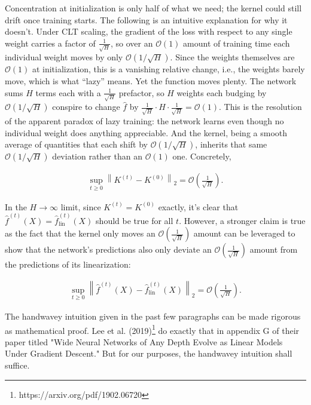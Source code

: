 Concentration at initialization is only half of what we need; the kernel could still drift once
training starts. The following is an intuitive explanation for why it doesn't. Under CLT scaling, the gradient
of the loss with respect to any single weight carries a factor of $\frac{1}{\sqrt{H}}$, so over an
$\mathcal{O}(1)$ amount of training time each individual weight moves by only
$\mathcal{O}(1/\sqrt{H})$. Since the weights themselves are $\mathcal{O}(1)$ at initialization, this
is a vanishing relative change, i.e., the weights barely move, which is what ``lazy'' means.
Yet the function moves plenty. The network sums $H$ terms each with a $\frac{1}{\sqrt H}$ prefactor,
so $H$ weights each budging by $\mathcal{O}(1/\sqrt{H})$ conspire to change $\hat{f}$ by
$\frac{1}{\sqrt{H}}\cdot H\cdot\frac{1}{\sqrt{H}} = \mathcal{O}(1)$. This is the resolution of the
apparent paradox of lazy training: the network learns even though no individual weight does anything
appreciable. And the kernel, being a smooth average of quantities that each shift by
$\mathcal{O}(1/\sqrt{H})$, inherits that same $\mathcal{O}(1/\sqrt{H})$ deviation rather than an
$\mathcal{O}(1)$ one. Concretely, 

\begin{align}
\sup_{t\geq 0} \left \| K^{(t)} - K^{(0)} \right \|_2 = \mathcal{O}\left (\frac{1}{\sqrt{H}}\right ).
\end{align}

In the $H\to\infty$ limit, since $K^{(t)}=K^{(0)}$ exactly, it's clear that 
$\hat{f}^{(t)}(X)=\hat{f}^{(t)}_{\text{lin}}(X)$ should be true for all $t$.
However, a stronger claim is true as
the fact that the kernel only moves an $\mathcal{O}(\frac{1}{\sqrt{H}})$ amount 
can be leveraged to show that the network's predictions also only deviate an
$\mathcal{O}(\frac{1}{\sqrt{H}})$ amount from the predictions of its linearization:

\begin{align}
\sup_{t\geq 0} \left \| \hat{f}^{(t)}(X) - \hat{f}^{(t)}_{\text{lin}}(X) \right \|_2 = \mathcal{O}\left (\frac{1}{\sqrt{H}}\right ).
\end{align}

The handwavey intuition given in the past few paragraphs can be made rigorous as
mathematical proof. Lee et al. (2019)\footnote{https://arxiv.org/pdf/1902.06720} do exactly that
in appendix G of their paper titled "Wide Neural Networks of Any Depth Evolve as Linear Models Under Gradient Descent."
But for our purposes, the handwavey intuition shall suffice.

